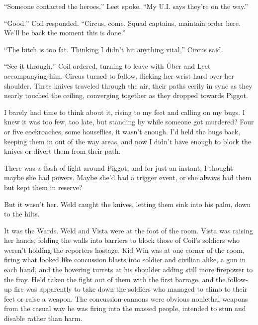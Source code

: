 ``Someone contacted the heroes,'' Leet spoke.  ``My U.I. says they're on the way.''



``Good,'' Coil responded.  ``Circus, come.  Squad captains, maintain order here.  We'll be back the moment this is done.''



``The bitch is too fat.  Thinking I didn't hit anything vital,'' Circus said.



``See it through,'' Coil ordered, turning to leave with \"{U}ber and Leet accompanying him.  Circus turned to follow, flicking her wrist hard over her shoulder.  Three knives traveled through the air, their paths eerily in sync as they nearly touched the ceiling, converging together as they dropped towards Piggot.



I barely had time to think about it, rising to my feet and calling on my bugs.  I knew it was too few, too late, but standing by while someone got murdered?  Four or five cockroaches, some houseflies, it wasn't enough.  I'd held the bugs back, keeping them in out of the way areas, and now I didn't have enough to block the knives or divert them from their path.



There was a flash of light around Piggot, and for just an instant, I thought maybe she had powers.  Maybe she'd had a trigger event, or she always had them but kept them in reserve?



But it wasn't her.  Weld caught the knives, letting them sink into his palm, down to the hilts.



It was the Wards.  Weld and Vista were at the foot of the room.  Vista was raising her hands, folding the walls into barriers to block those of Coil's soldiers who weren't holding the reporters hostage.  Kid Win was at one corner of the room, firing what looked like concussion blasts into soldier and civilian alike, a gun in each hand, and the hovering turrets at his shoulder adding still more firepower to the fray.  He'd taken the fight out of them with the first barrage, and the follow-up fire was apparently to take down the soldiers who managed to climb to their feet or raise a weapon.  The concussion-cannons were obvious nonlethal weapons from the casual way he was firing into the massed people, intended to stun and disable rather than harm.




